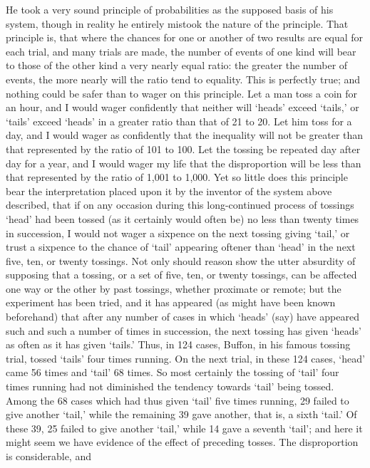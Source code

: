 \documentclass[letterpaper,12pt,oneside,openany]{memoir}
\begin{document}
He took a very sound principle of probabilities as
the supposed basis of his system, though in reality he
entirely mistook the nature of the principle. That
principle is, that where the chances for one or another
of two results are equal for each trial, and many trials
are made, the number of events of one kind will bear to
those of the other kind a very nearly equal ratio: the
greater the number of events, the more nearly will the
ratio tend to equality. This is perfectly true; and
nothing could be safer than to wager on this principle.
Let a man toss a coin for an hour, and I would wager
confidently that neither will `heads' exceed `tails,' or
`tails' exceed `heads' in a greater ratio than that of
21 to 20. Let him toss for a day, and I would wager
as confidently that the inequality will not be greater
than that represented by the ratio of 101 to 100. Let
the tossing be repeated day after day for a year, and I
would wager my life that the disproportion will be less
than that represented by the ratio of 1,001 to 1,000.
Yet so little does this principle bear the interpretation
placed upon it by the inventor of the system above
described, that if on any occasion during this long-continued
process of tossings `head' had been tossed (as it
certainly would often be) no less than twenty times in
succession, I would not wager a sixpence on the next
tossing giving `tail,' or trust a sixpence to the chance of
`tail' appearing oftener than `head' in the next five, ten,
or twenty tossings. Not only should reason show the
utter absurdity of supposing that a tossing, or a set of
five, ten, or twenty tossings, can be affected one way or
the other by past tossings, whether proximate or remote;
but the experiment has been tried, and it has appeared
(as might have been known beforehand) that after any
number of cases in which `heads' (say) have appeared
such and such a number of times in succession, the next
tossing has given `heads' as often as it has given `tails.'
Thus, in 124 cases, Buffon, in his famous tossing trial,
tossed `tails' four times running. On the next trial,
in these 124 cases, `head' came 56 times and `tail' 68
times. So most certainly the tossing of `tail' four
times running had not diminished the tendency towards
`tail' being tossed. Among the 68 cases which had
thus given `tail' five times running, 29 failed to give
another `tail,' while the remaining 39 gave another,
that is, a sixth `tail.' Of these 39, 25 failed to give
another `tail,' while 14 gave a seventh `tail'; and here
it might seem we have evidence of the effect of preceding
tosses. The disproportion is considerable, and
\end{document}
